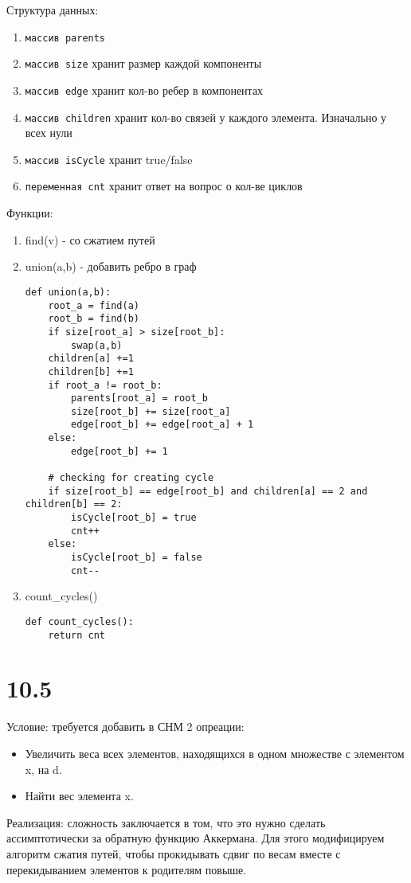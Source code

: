 \documentclass[12pt]{article}
\begin{document}
Структура данных:
\begin{enumerate}
    \item \texttt{массив parents} 
    \item \texttt{массив size} хранит размер каждой компоненты
    \item \texttt{массив edge} хранит кол-во ребер в компонентах
    \item \texttt{массив children} хранит кол-во связей у каждого элемента. Изначально у всех нули
    \item \texttt{массив isCycle} хранит true/false 
    \item \texttt{переменная cnt} хранит ответ на вопрос о кол-ве циклов
\end{enumerate}

Функции:
\begin{enumerate}
    \item find(v) - со сжатием путей
    \item union(a,b) - добавить ребро в граф
    \begin{lstlisting}
def union(a,b):
    root_a = find(a)
    root_b = find(b)
    if size[root_a] > size[root_b]:
        swap(a,b)
    children[a] +=1
    children[b] +=1
    if root_a != root_b:
        parents[root_a] = root_b
        size[root_b] += size[root_a]
        edge[root_b] += edge[root_a] + 1
    else:
        edge[root_b] += 1
    
    # checking for creating cycle
    if size[root_b] == edge[root_b] and children[a] == 2 and children[b] == 2:
        isCycle[root_b] = true
        cnt++
    else:
        isCycle[root_b] = false
        cnt--
    \end{lstlisting}   
    \item count\_cycles()
    \begin{lstlisting}
def count_cycles():
    return cnt
    \end{lstlisting}
\end{enumerate}
\section{10.5}
Условие: требуется добавить в СНМ 2 опреации:
\begin{itemize}
    \item Увеличить веса всех элементов, находящихся в одном множестве с элементом x, на d.
    \item Найти вес элемента x.
\end{itemize}

Реализация: сложность заключается в том, что это нужно сделать ассимптотически за обратную функцию Аккермана. Для этого модифицируем алгоритм сжатия путей, чтобы прокидывать сдвиг по весам вместе с перекидыванием элементов к родителям повыше.
\end{document}
